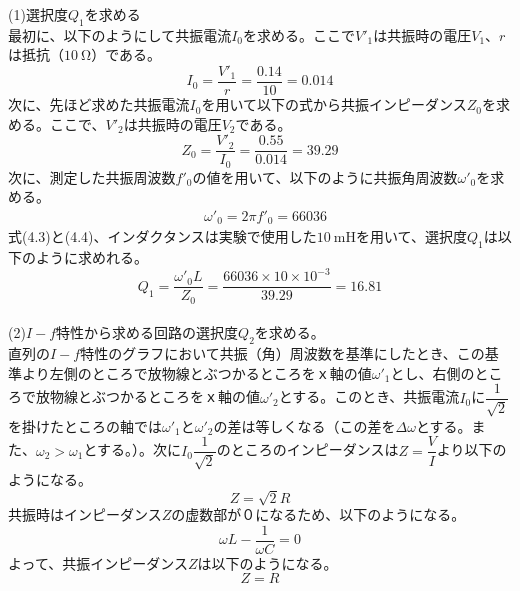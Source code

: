 \documentclass[12pt,a4paper]{jsarticle}
\numberwithin{equation}{section}
\numberwithin{figure}{section}
\numberwithin{table}{section}
\begin{document}
      (1)選択度$Q_1$を求める\\
      最初に、以下のようにして共振電流$I_0$を求める。ここで$V'_1$は共振時の電圧$V_1$、$r$は抵抗（$\SI{10}{\ohm}$）である。
      \begin{equation}
        I_0=\dfrac{V'_1}{r}=\dfrac{0.14}{10}=0.014
      \end{equation}
      次に、先ほど求めた共振電流$I_0$を用いて以下の式から共振インピーダンス$Z_0$を求める。ここで、$V'_2$は共振時の電圧$V_2$である。
      \begin{equation}
        Z_0=\dfrac{V'_2}{I_0}=\dfrac{0.55}{0.014}=39.29
      \end{equation}
      次に、測定した共振周波数$f'_0$の値を用いて、以下のように共振角周波数$\omega'_0$を求める。
      \begin{equation}
        \begin{split}
          & \omega'_0=2 \pi f'_0 = 66036
        \end{split}
      \end{equation}
      式(4.3)と(4.4)、インダクタンスは実験で使用した$\SI{10}{\milli\henry}$を用いて、選択度$Q_1$は以下のように求めれる。
      \begin{equation}
        Q_1=\dfrac{\omega'_0L}{Z_0}=\dfrac{66036 \times 10 \times 10^{-3}}{39.29}=16.81
      \end{equation}
      \\
      (2)$I-f$特性から求める回路の選択度$Q_2$を求める。\\
      直列の$I-f$特性のグラフにおいて共振（角）周波数を基準にしたとき、この基準より左側のところで放物線とぶつかるところをｘ軸の値$\omega'_1$とし、右側のところで放物線とぶつかるところをｘ軸の値$\omega'_2$とする。このとき、共振電流$I_0$に$\dfrac{1}{\sqrt{2}}$を掛けたところの軸では$\omega'_1$と$\omega'_2$の差は等しくなる（この差を$\Delta\omega$とする。また、$\omega_2 > \omega_1$とする。）。次に$I_0\dfrac{1}{\sqrt{2}}$のところのインピーダンスは$Z=\dfrac{V}{I}$より以下のようになる。
      \begin{equation}
        Z=\sqrt{2}R
      \end{equation}
      共振時はインピーダンス$Z$の虚数部が０になるため、以下のようになる。
      \begin{equation}
        \omega L-\dfrac{1}{\omega C}=0
      \end{equation}
      よって、共振インピーダンス$Z$は以下のようになる。
      \begin{equation}
        Z=R
      \end{equation}
\end{document}
